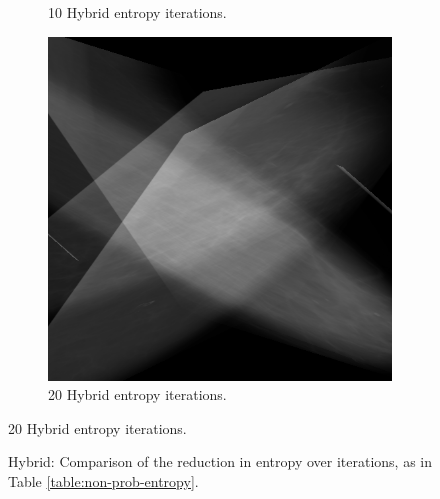 \begin{figure}[H]
\begin{subfigure}[t]{0.3\textwidth}
        \caption{10 Hybrid entropy iterations.}
        \label{fig:10-hybrid}
    \end{subfigure} \hfill
    \begin{subfigure}[t]{0.3\textwidth}
      \includegraphics[width=\textwidth]{Chapter3/hybrid-img/hybrid20.png}
      \caption{20 Hybrid entropy iterations.}
      \label{fig:20-hybrid}
    \end{subfigure}
\end{figure}

\begin{figure}[H]
  \begin{center}

    \caption{Hybrid: Comparison of the reduction in entropy over iterations, as in Table \ref{table:non-prob-entropy}.}
  \end{center}
\end{figure}

\begin{table}
    \caption{Entropy table for Hybrid}
    \label{table:hybrid-entropy}
\end{table}
